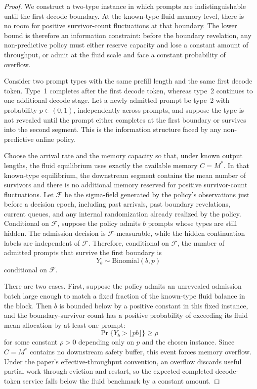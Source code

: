 \begin{proof}
We construct a two-type instance in which prompts are indistinguishable until the first decode boundary. At the known-type fluid memory level, there is no room for positive survivor-count fluctuations at that boundary. The lower bound is therefore an information constraint: before the boundary revelation, any non-predictive policy must either reserve capacity and lose a constant amount of throughput, or admit at the fluid scale and face a constant probability of overflow.

Consider two prompt types with the same prefill length and the same first decode token. Type~1 completes after the first decode token, whereas type~2 continues to one additional decode stage. Let a newly admitted prompt be type~2 with probability \(p\in(0,1)\), independently across prompts, and suppose the type is not revealed until the prompt either completes at the first boundary or survives into the second segment. This is the information structure faced by any non-predictive online policy.

Choose the arrival rate and the memory capacity so that, under known output lengths, the fluid equilibrium uses exactly the available memory \(C=M^*\). In that known-type equilibrium, the downstream segment contains the mean number of survivors and there is no additional memory reserved for positive survivor-count fluctuations. Let \(\mathcal F\) be the sigma-field generated by the policy's observations just before a decision epoch, including past arrivals, past boundary revelations, current queues, and any internal randomization already realized by the policy. Conditional on \(\mathcal F\), suppose the policy admits \(b\) prompts whose types are still hidden. The admission decision is \(\mathcal F\)-measurable, while the hidden continuation labels are independent of \(\mathcal F\). Therefore, conditional on \(\mathcal F\), the number of admitted prompts that survive the first boundary is
\[
    Y_b\sim\mathrm{Binomial}(b,p)
\]
conditional on \(\mathcal F\).

There are two cases. First, suppose the policy admits an unrevealed admission batch large enough to match a fixed fraction of the known-type fluid balance in the block. Then \(b\) is bounded below by a positive constant in this fixed instance, and the boundary-survivor count has a positive probability of exceeding its fluid mean allocation by at least one prompt:
\[
    \Pr\{Y_b>\lfloor pb\rfloor\}\ge \rho
\]
for some constant \(\rho>0\) depending only on \(p\) and the chosen instance. Since \(C=M^*\) contains no downstream safety buffer, this event forces memory overflow. Under the paper's effective-throughput convention, an overflow discards useful partial work through eviction and restart, so the expected completed decode-token service falls below the fluid benchmark by a constant amount.


\end{proof}

